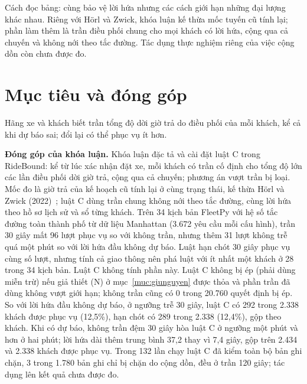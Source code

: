 Cách đọc bảng: cùng bảo vệ lời hứa nhưng các cách giới hạn những đại lượng khác nhau. Riêng với Hörl và Zwick,
khóa luận kế thừa mốc tuyến cũ tính lại; phần làm thêm là trần điều phối chung cho mọi khách có lời hứa, cộng
qua cả chuyến và không nới theo tắc đường. Tác dụng thực nghiệm riêng của việc cộng dồn còn chưa được đo.

\section{Mục tiêu và đóng góp}
\label{muc:c1-donggop}

Hãng xe và khách biết trần tổng độ dời giờ trả do điều phối của mỗi khách, kể cả khi dự báo sai;
đổi lại có thể phục vụ ít hơn.

\noindent\textbf{Đóng góp của khóa luận.}
Khóa luận đặc tả và cài đặt luật C trong RideBound: kể từ lúc xác nhận đặt xe, mỗi khách có trần cố định cho
tổng độ lớn các lần điều phối dời giờ trả, cộng qua cả chuyến; phương án vượt trần bị loại. Mốc đo là giờ trả
của kế hoạch cũ tính lại ở cùng trạng thái, kế thừa Hörl và Zwick (2022)~\cite{horl2022}; luật C dùng trần chung
không nới theo tắc đường, cùng lời hứa theo hồ sơ lịch sử và sổ từng khách. Trên 34 kịch bản FleetPy với hệ số
tắc đường toàn thành phố từ dữ liệu Manhattan (3.672 yêu cầu mỗi cấu hình), trần 30 giây mất 96 lượt phục vụ
so với không trần, nhưng thêm 31 lượt không trễ quá một phút so với lời hứa đầu không dự báo. Luật hạn chót
30 giây phục vụ cùng số lượt, nhưng tính cả giao thông nên phá luật với ít nhất một khách ở 28 trong 34 kịch bản.
Luật C không tính phần này. Luật C không bị ép (phải dùng miễn trừ) nếu giả thiết (N) ở mục~\ref{muc:giunguyen}
được thỏa và phần trần đã dùng không vượt giới hạn; không trần cũng có 0 trong 20.760 quyết định bị ép.
So với lời hứa đầu không dự báo, ở ngưỡng trễ 30 giây, luật C có 292 trong 2.338 khách được phục vụ (12,5\%),
hạn chót có 289 trong 2.338 (12,4\%), gộp theo khách. Khi có dự báo, không trần đệm 30 giây hòa luật C ở ngưỡng
một phút và hơn ở hai phút; lời hứa dài thêm trung bình 37,2 thay vì 7,4 giây, gộp trên 2.434 và 2.338 khách
được phục vụ. Trong 132 lần chạy luật C đã kiểm toàn bộ bản ghi chặn, 3 trong 1.780 bản ghi chỉ bị chặn do
cộng dồn, đều ở trần 120 giây; tác dụng lên kết quả chưa được đo.

